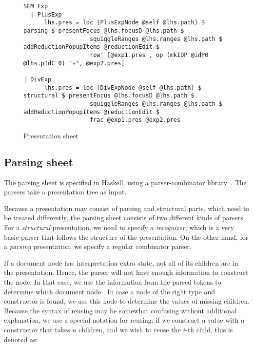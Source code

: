 \bc
\begin{figure}
\begin{small}
\begin{center}
\begin{footnotesize}
\begin{verbatim}
SEM Exp
  | PlusExp
      lhs.pres = loc (PlusExpNode @self @lhs.path) $ parsing $ presentFocus @lhs.focusD @lhs.path $
                   squiggleRanges @lhs.ranges @lhs.path $ addReductionPopupItems @reductionEdit $
                   row' [@exp1.pres , op (mkIDP @idP0 @lhs.pIdC 0) "+", @exp2.pres]

| DivExp      
      lhs.pres = loc (DivExpNode @self @lhs.path) $ structural $ presentFocus @lhs.focusD @lhs.path $
                   squiggleRanges @lhs.ranges @lhs.path $ addReductionPopupItems @reductionEdit $
                   frac @exp1.pres @exp2.pres
\end{verbatim}
\end{footnotesize}
\caption{Presentation sheet}\label{presSheetExample} 
\end{center}
\end{small}
\end{figure}
\ec

\subsection{Parsing sheet}

The parsing sheet is specified in Haskell, using a parser-combinator library~\cite{swierstra01parsers}. The parsers take a presentation tree as input. 

Because a presentation may consist of parsing and structural parts, which need to be treated differently, the parsing sheet consists of two different kinds of parsers. For a {\em structural} presentation, we need to specify a {\em recognizer}, which is a very basic parser that follows the structure of the presentation. On the other hand, for a {\em parsing} presentation, we specify a regular combinator parser. 

If a document node has interpretation extra state, not all of its children are in the presentation. Hence, the parser will not have enough information to construct the node. In that case, we use the information from the parsed tokens to determine which document node . In case a node of the right type and constructor is found, we use this node to determine the values of missing children. Because the syntax of reusing may be somewhat confusing without additional explanation, we use a special notation for reusing: if we  construct a value with a constructor  that takes $n$ children, and we wish to reuse the $i$-th child, this is denoted as:

